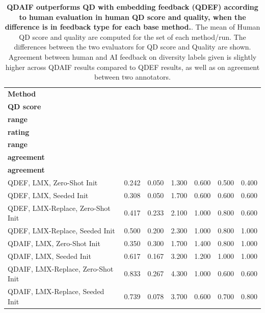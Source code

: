 \begin{table}[t]
\caption{\textbf{QDAIF outperforms QD with embedding feedback (QDEF) according to human evaluation in human QD score and quality, when the difference is in feedback type for each base method.}. The mean of Human QD score and quality are computed for the set of each method/run. The differences between the two evaluators for QD score and Quality are shown. Agreement between human and AI feedback on diversity labels given is slightly higher across QDAIF results compared to QDEF results, as well as on agreement between two annotators.}
\label{table:ef_vs_aif}
\centering
\scriptsize
\begin{tabular}{@{}lcccccc@{}}
\toprule
\textbf{Method} &
\makecell[c]{\textbf{Human}\\\textbf{QD score}} & 
\makecell[c]{\textbf{QD score}\\\textbf{range}} &
\makecell[c]{\textbf{Quality}\\\textbf{rating}} &
\makecell[c]{\textbf{Quality}\\\textbf{range}}  & 
\makecell[c]{\textbf{Human-AI}\\\textbf{agreement}} & 
\makecell[c]{\textbf{Human}\\\textbf{agreement}}  \\
\midrule
        QDEF, LMX, Zero-Shot Init  & 0.242 & 0.050 & 1.300 & 0.600 & 0.500 & 0.400  \\ 
        QDEF, LMX, Seeded Init  & 0.308 & 0.050 & 1.700 & 0.600 & 0.600 & 0.600  \\ 
        QDEF, LMX-Replace, Zero-Shot Init  & 0.417 & 0.233 & 2.100 & 1.000 & 0.800 & 0.600  \\ 
        QDEF, LMX-Replace, Seeded Init  & 0.500 & 0.200 & 2.300 & 1.000 & 0.800 & 1.000  \\ 
        QDAIF, LMX, Zero-Shot Init  & 0.350 & 0.300 & 1.700 & 1.400 & 0.800 & 1.000  \\ 
        QDAIF, LMX, Seeded Init  & 0.617 & 0.167 & 3.200 & 1.200 & 1.000 & 1.000  \\ 
        QDAIF, LMX-Replace, Zero-Shot Init  & 0.833 & 0.267 & 4.300 & 1.000 & 0.600 & 0.600  \\ 
        QDAIF, LMX-Replace, Seeded Init & 0.739 & 0.078 & 3.700 & 0.600 & 0.700 & 0.800 \\ 
\bottomrule
\end{tabular}
\end{table}